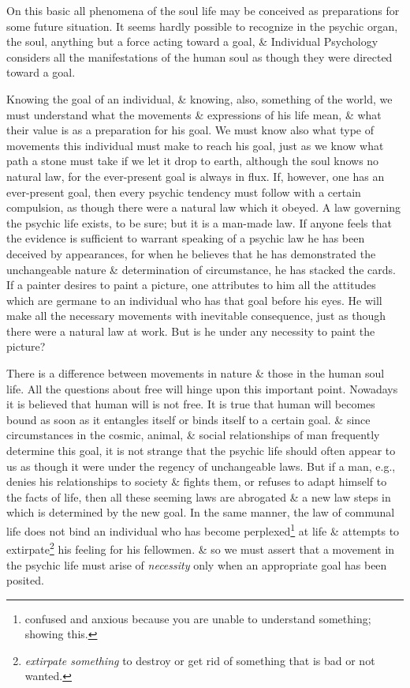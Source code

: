 \documentclass{article}
\begin{document}
On this basic all phenomena of the soul life may be conceived as preparations for some future situation. It seems hardly possible to recognize in the psychic organ, the soul, anything but a force acting toward a goal, \& Individual Psychology considers all the manifestations of the human soul as though they were directed toward a goal.

Knowing the goal of an individual, \& knowing, also, something of the world, we must understand what the movements \& expressions of his life mean, \& what their value is as a preparation for his goal. We must know also what type of movements this individual must make to reach his goal, just as we know what path a stone must take if we let it drop to earth, although the soul knows no natural law, for the ever-present goal is always in flux. If, however, one has an ever-present goal, then every psychic tendency must follow with a certain compulsion, as though there were a natural law which it obeyed. A law governing the psychic life exists, to be sure; but it is a man-made law. If anyone feels that the evidence is sufficient to warrant speaking of a psychic law he has been deceived by appearances, for when he believes that he has demonstrated the unchangeable nature \& determination of circumstance, he has stacked the cards. If a painter desires to paint a picture, one attributes to him all the attitudes which are germane to an individual who has that goal before his eyes. He will make all the necessary movements with inevitable consequence, just as though there were a natural law at work. But is he under any necessity to paint the picture?

There is a difference between movements in nature \& those in the human soul life. All the questions about free will hinge upon this important point. Nowadays it is believed that human will is not free. It is true that human will becomes bound as soon as it entangles itself or binds itself to a certain goal. \& since circumstances in the cosmic, animal, \& social relationships of man frequently determine this goal, it is not strange that the psychic life should often appear to us as though it were under the regency of unchangeable laws. But if a man, e.g., denies his relationships to society \& fights them, or refuses to adapt himself to the facts of life, then all these seeming laws are abrogated \& a new law steps in which is determined by the new goal. In the same manner, the law of communal life does not bind an individual who has become perplexed\footnote{confused and anxious because you are unable to understand something; showing this.} at life \& attempts to extirpate\footnote{{\it extirpate something} to destroy or get rid of something that is bad or not wanted.} his feeling for his fellowmen. \& so we must assert that a movement in the psychic life must arise of {\it necessity} only when an appropriate goal has been posited.
\end{document}
